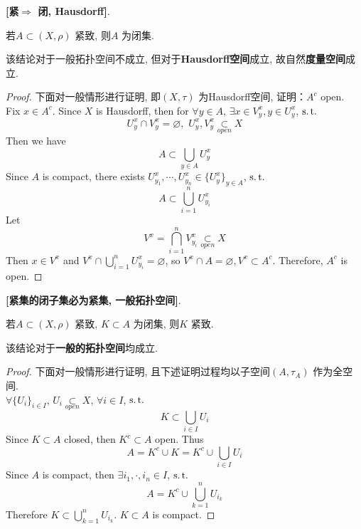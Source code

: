 	\begin{proposition}\label{prop 1.6.1}
		\textbf{[紧$\Rightarrow$ 闭, Hausdorff]}. 
		\begin{center}
			若$A \subset (X , \rho)$ 紧致, 则$A$ 为闭集.
		\end{center}
		
		\vspace{2em}
		
		\begin{rmk}
			该结论对于一般拓扑空间不成立, 但对于\textbf{Hausdorff空间}成立, 故自然\textbf{度量空间}成立.
		\end{rmk}
	
		\vspace{2em}
		
		\begin{proof}
			下面对一般情形进行证明, 即$(X , \tau)$ 为Hausdorff空间, 证明：$A^c$ open. \\
			Fix $x \in A^c$. Since $X$ is Hausdorff, then for $\forall y \in A$, $\exists x \in V_{y}^x , y \in U_{y}^x$, $\operatorname{s.t.}$
			\[ U_{y}^x \cap V_{y}^x = \varnothing , \,\, U_{y}^{x} , V_{y}^x \underset{open}{\subset} X \]
			Then we have
			\[ A \subset \bigcup_{y \in A} U_{y}^x \]
			Since $A$ is compact, there exists $U_{y_1}^x , \cdots , U_{y_n}^x \in \{ U_{y}^x \}_{y \in A}$, $\operatorname{s.t.}$
			\[ A \subset \bigcup_{i = 1}^{n} U_{y_i}^x \]
			Let
			\[ V^x = \bigcap_{i = 1}^{n} V_{y_i}^x \underset{open}{\subset} X \]
			Then $x \in V^x$ and $V^x \cap \bigcup_{i = 1}^{n} U_{y_i}^x = \varnothing$, so $V^x \cap A = \varnothing , V^x \subset A^c$. Therefore, $A^c$ is open.
		\end{proof}
	\end{proposition}

	\newpage
	
	\begin{proposition}\label{prop 1.6.2}
		\textbf{[紧集的闭子集必为紧集, 一般拓扑空间]}. 
		\begin{center}
			若$A \subset (X , \rho)$ 紧致, $K \subset A$ 为闭集, 则$K$ 紧致.
		\end{center}
		
		\begin{rmk}
			该结论对于\textbf{一般的拓扑空间}均成立. 
		\end{rmk}
	
		\vspace{1em}
		
		\begin{proof}
			下面对一般情形进行证明, 且下述证明过程均以子空间$(A , \tau_A)$ 作为全空间. \\
			$\forall \{ U_i \}_{i \in I}$, $U_i \underset{open}{\subset} X$, $\forall i \in I$, $\operatorname{s.t.}$
			\[ K \subset \bigcup_{i \in I}{U_i} \]
			Since $K \subset A$ closed, then $K^c \subset A$ open. Thus
			\[ A = K^c \cup K = K^c \cup \bigcup_{i \in I} U_i \]
			Since $A$ is compact, then $\exists i_1 , \cdot , i_n \in I$, $\operatorname{s.t.}$
			\[ A = K^c \cup \bigcup_{k = 1}^{n} U_{i_k} \]
			Therefore $K \subset \bigcup_{k = 1}^{n} U_{i_k}$. $K \subset A$ is compact.
		\end{proof}
	\end{proposition}
	
